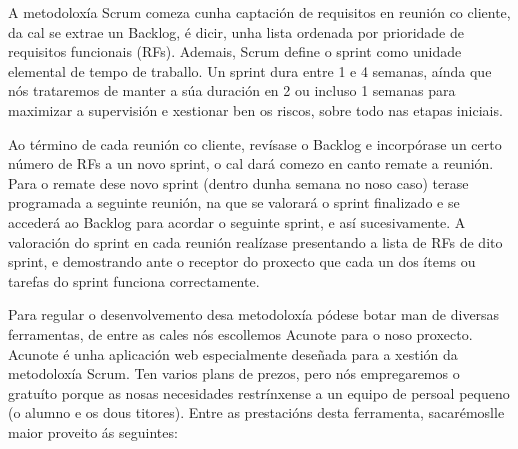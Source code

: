 A metodoloxía Scrum comeza cunha captación de requisitos en reunión co cliente, da cal se extrae un Backlog, é dicir, unha lista ordenada por prioridade de requisitos funcionais (RFs). Ademais, Scrum define o sprint como unidade elemental de tempo de traballo. Un sprint dura entre 1 e 4 semanas, aínda que nós trataremos de manter a súa duración en 2 ou incluso 1 semanas para maximizar a supervisión e xestionar ben os riscos, sobre todo nas etapas iniciais.

Ao término de cada reunión co cliente, revísase o Backlog e incorpórase un certo número de RFs a un novo sprint, o cal dará comezo en canto remate a reunión. Para o remate dese novo sprint (dentro dunha semana no noso caso) terase programada a seguinte reunión, na que se valorará o sprint finalizado e se accederá ao Backlog para acordar o seguinte sprint, e así sucesivamente. A valoración do sprint en cada reunión realízase presentando a lista de RFs de dito sprint, e demostrando ante o receptor do proxecto que cada un dos ítems ou tarefas do sprint funciona correctamente.

Para regular o desenvolvemento desa metodoloxía pódese botar man de diversas ferramentas, de entre as cales nós escollemos Acunote\cite{acunote} para o noso proxecto. Acunote é unha aplicación web especialmente deseñada para a xestión da metodoloxía Scrum. Ten varios plans de prezos, pero nós empregaremos o gratuíto porque as nosas necesidades restrínxense a un equipo de persoal pequeno (o alumno e os dous titores). Entre as prestacións desta ferramenta, sacarémoslle maior proveito ás seguintes:

